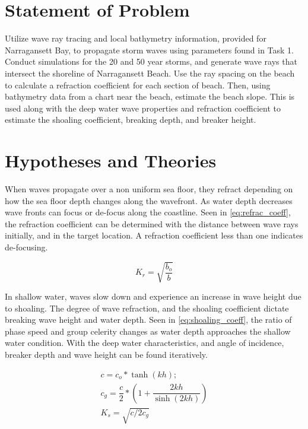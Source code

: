 \section{Statement of Problem}
Utilize wave ray tracing and local bathymetry information, provided for Narragansett Bay, to propagate storm waves using parameters found in Task 1. Conduct simulations for the 20 and 50 year storms, and generate wave rays that intersect the shoreline of Narragansett Beach. Use the ray spacing on the beach to calculate a refraction coefficient for each section of beach. Then, using bathymetry data from a chart near the beach, estimate the beach slope. This is used along with the deep water wave properties and refraction coefficient to estimate the shoaling coefficient, breaking depth, and breaker height. 


\section{Hypotheses and Theories}

When waves propagate over a non uniform sea floor, they refract depending on how the sea floor depth changes along the wavefront. As water depth decreases wave fronts can focus or de-focus along the coastline. Seen in \ref{eq:refrac_coeff}, the refraction coefficient can be determined with the distance between wave rays initially, and in the target location. A refraction coefficient less than one indicates de-focusing.

\begin{equation}
K_{r} = \sqrt{\dfrac{b_{o}}{b}}
\label{eq:refrac_coeff}
\end{equation}

In shallow water, waves slow down and experience an increase in wave height due to shoaling. The degree of wave refraction, and the shoaling coefficient dictate breaking wave height and water depth. Seen in \ref{eq:shoaling_coeff}, the ratio of phase speed and group celerity changes as water depth approaches the shallow water condition. With the deep water characteristics, and angle of incidence, breaker depth and wave height can be found iteratively.

\begin{align}[H]
c = c_{o} * \tanh(kh); \\
c_{g} = \dfrac{c}{2} * \left(1 + \dfrac{2kh}{\sinh(2kh)}\right) \\
K_{s} = \sqrt{c/2c_{g}}
\label{eq:shoaling_coeff}
\end{align}

